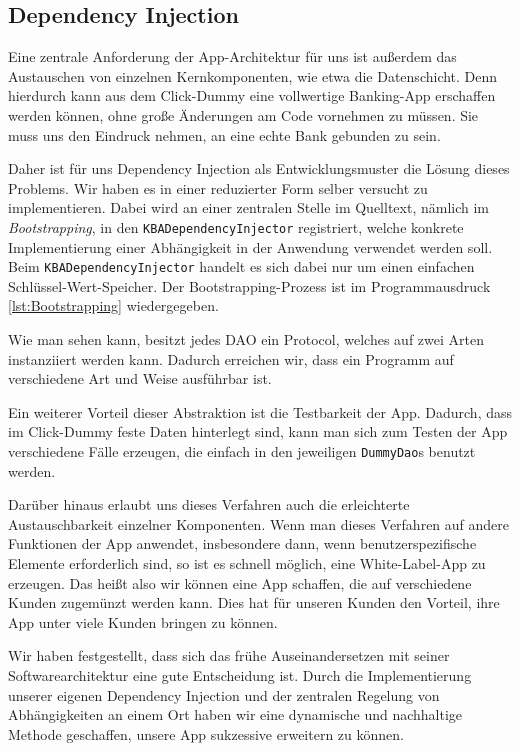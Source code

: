\subsection{Dependency Injection}
	Eine zentrale Anforderung der App-Architektur für uns ist außerdem das Austauschen von einzelnen Kernkomponenten, wie etwa die Datenschicht. Denn hierdurch kann aus dem Click-Dummy eine vollwertige Banking-App erschaffen werden können, ohne große Änderungen am Code vornehmen zu müssen. Sie muss uns den Eindruck nehmen, an eine echte Bank gebunden zu sein.
	
	Daher ist für uns Dependency Injection als Entwicklungsmuster die Lösung dieses Problems. Wir haben es in einer reduzierter Form selber versucht zu implementieren. Dabei wird an einer zentralen Stelle im Quelltext, nämlich im \emph{Bootstrapping}, in den \texttt{KBADependencyInjector} registriert, welche konkrete Implementierung einer Abhängigkeit in der Anwendung verwendet werden soll. Beim \texttt{KBADependencyInjector} handelt es sich dabei nur um einen einfachen Schlüssel-Wert-Speicher. Der Bootstrapping-Prozess ist im Programmausdruck \ref{lst:Bootstrapping} wiedergegeben.
	
	
	
	Wie man sehen kann, besitzt jedes \ac{DAO} ein Protocol, welches auf zwei Arten instanziiert werden kann. Dadurch erreichen wir, dass ein Programm auf verschiedene Art und Weise ausführbar ist.
	
	Ein weiterer Vorteil dieser Abstraktion ist die Testbarkeit der App. Dadurch, dass im Click-Dummy feste Daten hinterlegt sind, kann man sich zum Testen der App verschiedene Fälle erzeugen, die einfach in den jeweiligen \texttt{DummyDao}s benutzt werden.
	
	Darüber hinaus erlaubt uns dieses Verfahren auch die erleichterte Austauschbarkeit einzelner Komponenten. Wenn man dieses Verfahren auf andere Funktionen der App anwendet, insbesondere dann, wenn benutzerspezifische Elemente erforderlich sind, so ist es schnell möglich, eine White-Label-App zu erzeugen. Das heißt also wir können eine App schaffen, die auf verschiedene Kunden zugemünzt werden kann. Dies hat für unseren Kunden den Vorteil, ihre App unter viele Kunden bringen zu können.
	
	Wir haben festgestellt, dass sich das frühe Auseinandersetzen mit seiner Softwarearchitektur eine gute Entscheidung ist. Durch die Implementierung unserer eigenen Dependency Injection und der zentralen Regelung von Abhängigkeiten an einem Ort haben wir eine dynamische und nachhaltige Methode geschaffen, unsere App sukzessive erweitern zu können.